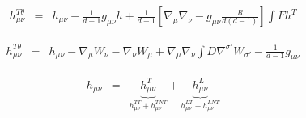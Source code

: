 \documentclass[10pt,letterpaper]{article}
\numberwithin{equation}{section}
\begin{document}
\begin{eqnarray}
h_{\mu\nu}^{T\theta} &=& h_{\mu\nu} - \frac{1}{d-1}g_{\mu\nu} h
+ \frac{1}{d-1}\left[\nabla_\mu\nabla_\nu - g_{\mu\nu}\frac{R}{d(d-1)}\right] \int F h^T 
\end{eqnarray}

\begin{eqnarray}
h^{T\theta}_{\mu\nu} &=& h_{\mu\nu}-\nabla_\mu W_\nu -\nabla_\nu W_\mu + \nabla_\mu\nabla_\nu \int D \nabla^{\sigma'}W_{\sigma'} - \frac{1}{d-1} g_{\mu\nu}
\end{eqnarray}



\begin{eqnarray}
h_{\mu\nu} &=& \underbrace{h_{\mu\nu}^T}_{h_{\mu\nu}^{TT}+h_{\mu\nu}^{TNT}} 
+\underbrace{h_{\mu\nu}^L}_{h_{\mu\nu}^{LT}+h_{\mu\nu}^{LNT}} 
\end{eqnarray}
\end{document}

